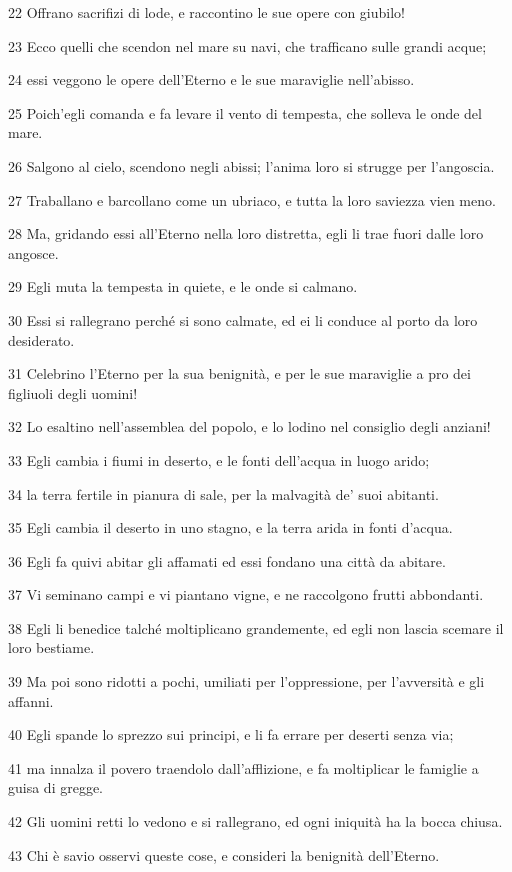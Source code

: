 \par 22 Offrano sacrifizi di lode, e raccontino le sue opere con giubilo!
\par 23 Ecco quelli che scendon nel mare su navi, che trafficano sulle grandi acque;
\par 24 essi veggono le opere dell'Eterno e le sue maraviglie nell'abisso.
\par 25 Poich'egli comanda e fa levare il vento di tempesta, che solleva le onde del mare.
\par 26 Salgono al cielo, scendono negli abissi; l'anima loro si strugge per l'angoscia.
\par 27 Traballano e barcollano come un ubriaco, e tutta la loro saviezza vien meno.
\par 28 Ma, gridando essi all'Eterno nella loro distretta, egli li trae fuori dalle loro angosce.
\par 29 Egli muta la tempesta in quiete, e le onde si calmano.
\par 30 Essi si rallegrano perché si sono calmate, ed ei li conduce al porto da loro desiderato.
\par 31 Celebrino l'Eterno per la sua benignità, e per le sue maraviglie a pro dei figliuoli degli uomini!
\par 32 Lo esaltino nell'assemblea del popolo, e lo lodino nel consiglio degli anziani!
\par 33 Egli cambia i fiumi in deserto, e le fonti dell'acqua in luogo arido;
\par 34 la terra fertile in pianura di sale, per la malvagità de' suoi abitanti.
\par 35 Egli cambia il deserto in uno stagno, e la terra arida in fonti d'acqua.
\par 36 Egli fa quivi abitar gli affamati ed essi fondano una città da abitare.
\par 37 Vi seminano campi e vi piantano vigne, e ne raccolgono frutti abbondanti.
\par 38 Egli li benedice talché moltiplicano grandemente, ed egli non lascia scemare il loro bestiame.
\par 39 Ma poi sono ridotti a pochi, umiliati per l'oppressione, per l'avversità e gli affanni.
\par 40 Egli spande lo sprezzo sui principi, e li fa errare per deserti senza via;
\par 41 ma innalza il povero traendolo dall'afflizione, e fa moltiplicar le famiglie a guisa di gregge.
\par 42 Gli uomini retti lo vedono e si rallegrano, ed ogni iniquità ha la bocca chiusa.
\par 43 Chi è savio osservi queste cose, e consideri la benignità dell'Eterno.

